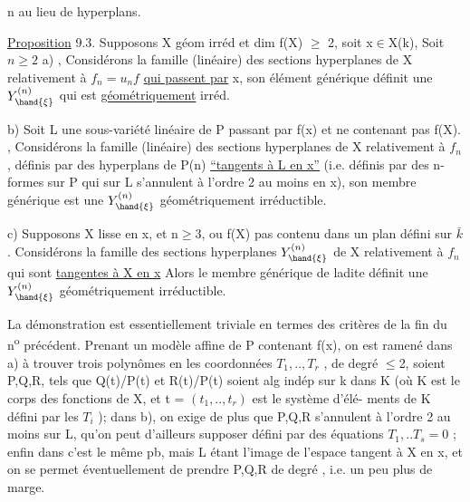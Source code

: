 
n  au lieu de  hyperplans.

\uline{Proposition} 9.3.  Supposons X géom irréd et dim f(X) $\geq$ 2,  soit x$\in$X(k), Soit $n\geq 2$ 
 a) , Considérons la famille (linéaire) des sections hyperplanes
de X relativement à $f_n=u_nf$ \uline{qui passent par} x, son élément
générique  définit une $Y^{(n)}_{\hand{\xi}}$ qui est \uline{géométriquement} irréd.

b) 
 Soit L une sous-variété linéaire de P passant par f(x) et
ne contenant pas f(X). , Considérons la famille (linéaire) des
sections hyperplanes de X relativement à  $f_n$  , définis
par des hyperplans de P(n)  \uline{``tangents à L en x''} (i.e. définis
par des n-formes sur P qui sur L s'annulent à l'ordre 2 au moins en x), son
membre générique  est une $Y^{(n)}_{\hand{\xi}}$ géométriquement irréductible.

c) Supposons X lisse en x,  et  n$\geq$3, ou f(X) pas contenu dans un plan défini sur $\bar{k}$.  Considérons
la famille des sections hyperplanes   $Y^{(n)}_{\hand{\xi}}$ de X relativement
à $f_n$ qui sont \uline{tangentes à X en x}\unsure{,} Alors le membre générique de ladite
définit une $Y^{(n)}_{\hand{\xi}}$ géométriquement irréductible.

La démonstration est essentiellement triviale en termes des
critères de la fin du n\textsuperscript{o} précédent. Prenant un modèle affine de P
contenant f(x), on est ramené dans a) à trouver  trois polynômes
en les coordonnées $T_1,..,T_r$ , de degré $\leq$2, soient P,Q,R, tels que
Q(t)/P(t) et R(t)/P(t) soient alg indép sur k dans K (où K est le
corps des fonctions de X, et t = $(t_1,..,t_r)$ est le système d'élé-%
ments de K défini par les $T_i$ ); dans b), on exige de plus que P,Q,R
s'annulent à l'ordre 2 au moins sur L, qu'on peut d'ailleurs supposer
défini par des équations $T_1,..T_s = 0$ ; enfin dans  c'est le même
pb, mais L étant l'image de l'espace tangent à X en x, et on se permet
éventuellement de prendre P,Q,R  de degré  , i.e. un peu plus de marge.

